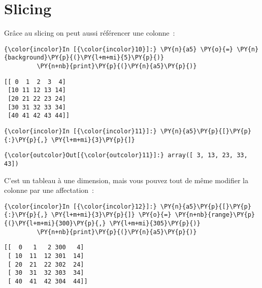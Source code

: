     \hypertarget{slicing}{%
\section{Slicing}\label{slicing}}

    Grâce au slicing on peut aussi référencer une colonne~:

    \begin{Verbatim}[commandchars=\\\{\}]
{\color{incolor}In [{\color{incolor}10}]:} \PY{n}{a5} \PY{o}{=} \PY{n}{background}\PY{p}{(}\PY{l+m+mi}{5}\PY{p}{)}
         \PY{n+nb}{print}\PY{p}{(}\PY{n}{a5}\PY{p}{)}
\end{Verbatim}


    \begin{Verbatim}[commandchars=\\\{\}]
[[ 0  1  2  3  4]
 [10 11 12 13 14]
 [20 21 22 23 24]
 [30 31 32 33 34]
 [40 41 42 43 44]]

    \end{Verbatim}

    \begin{Verbatim}[commandchars=\\\{\}]
{\color{incolor}In [{\color{incolor}11}]:} \PY{n}{a5}\PY{p}{[}\PY{p}{:}\PY{p}{,} \PY{l+m+mi}{3}\PY{p}{]}
\end{Verbatim}


\begin{Verbatim}[commandchars=\\\{\}]
{\color{outcolor}Out[{\color{outcolor}11}]:} array([ 3, 13, 23, 33, 43])
\end{Verbatim}
            
    C'est un tableau à une dimension, mais vous pouvez tout de même modifier
la colonne par une affectation~:

    \begin{Verbatim}[commandchars=\\\{\}]
{\color{incolor}In [{\color{incolor}12}]:} \PY{n}{a5}\PY{p}{[}\PY{p}{:}\PY{p}{,} \PY{l+m+mi}{3}\PY{p}{]} \PY{o}{=} \PY{n+nb}{range}\PY{p}{(}\PY{l+m+mi}{300}\PY{p}{,} \PY{l+m+mi}{305}\PY{p}{)}
         \PY{n+nb}{print}\PY{p}{(}\PY{n}{a5}\PY{p}{)}
\end{Verbatim}


    \begin{Verbatim}[commandchars=\\\{\}]
[[  0   1   2 300   4]
 [ 10  11  12 301  14]
 [ 20  21  22 302  24]
 [ 30  31  32 303  34]
 [ 40  41  42 304  44]]

    \end{Verbatim}

